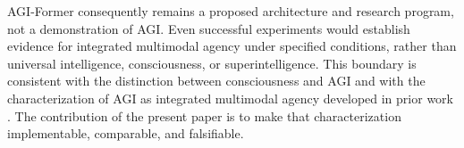 AGI-Former consequently remains a proposed architecture and research program, not a demonstration of AGI. Even successful experiments would establish evidence for integrated multimodal agency under specified conditions, rather than universal intelligence, consciousness, or superintelligence. This boundary is consistent with the distinction between consciousness and AGI and with the characterization of AGI as integrated multimodal agency developed in prior work \cite{zohourian2026agi}. The contribution of the present paper is to make that characterization implementable, comparable, and falsifiable.
